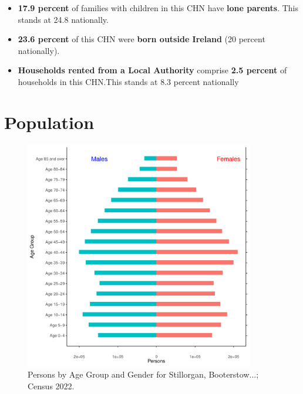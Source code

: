 \documentclass{article}
\begin{document}
\begin{itemize}
\item \textbf{17.9 percent} of families with children in this CHN have \textbf{lone parents}. This stands at 24.8 nationally.

\item \textbf{23.6 percent} of this CHN were \textbf{born outside Ireland} (20 percent nationally).

\item \textbf{Households rented from a Local Authority} comprise \textbf{2.5 percent} of households in this CHN.This stands at 8.3 percent nationally

\end{itemize}

\pagebreak

\section{Population} 
\label{sect:Pop}

\begin{figure}[h]
	\centering
	\includegraphics[width = 100mm]{../figures/PyramidPlot.pdf}
	\caption{Persons by Age Group and Gender for Stillorgan, Booterstow...; Census 2022.}
	\label{fig:2ae19629-1a6a-13a3-e055-000000000001}
	\end{figure}
\end{document}
